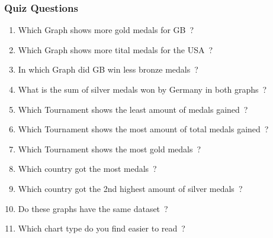 \subsubsection*{Quiz Questions}
\begin{enumerate}
    \setlength{\itemsep}{1pt}
	\setlength{\parskip}{0pt}
	\setlength{\parsep}{0pt}
    \item Which Graph shows more gold medals for GB~?
    \item Which Graph shows more tital medals for the USA~?
    \item In which Graph did GB win less bronze medals~?
    \item What is the sum of silver medals won by Germany in both graphs~?
    \item Which Tournament shows the least amount of medals gained~?
    \item Which Tournament shows the most amount of total medals gained~?
    \item Which Tournament shows the most gold medals~?
    \item Which country got the most medals~?
    \item Which country got the 2nd highest amount of silver medals~?
    \item Do these graphs have the same dataset~?
    \item Which chart type do you find easier to read~?
\end{enumerate}
